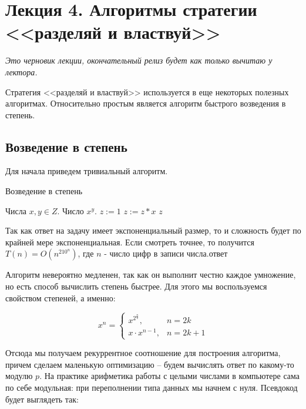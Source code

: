 \documentclass[../book.tex]{subfiles}
\begin{document}
	\section{Лекция 4. Алгоритмы стратегии <<разделяй и властвуй>>}
		\textit{Это черновик лекции, окончательный релиз будет как только вычитаю у лектора.}
		
		
		Стратегия <<разделяй и властвуй>> используется в еще некоторых полезных алгоритмах. Относительно простым является алгоритм быстрого возведения в степень.
		
		\subsection{Возведение в степень}
		
		Для начала приведем тривиальный алгоритм.
		
		\begin{algorithm}[H]
			\caption{Возведение в степень}
			\begin{algorithmic}[1]
				\Require Числа $x, y \in Z$.
				\Ensure Число $x^y$.
					\State $z := 1$
						\State $z := z * x$
					\EndFor
					\State \Return $z$
				\EndFunction
			\end{algorithmic}
		\end{algorithm}
		
		\begin{time}
			Так как ответ на задачу имеет экспоненциальный размер, то и сложность будет по крайней мере экспоненциальная. Если смотреть точнее, то получится $T(n) = O(n^210^n)$, где $n$ - число цифр в записи числа.ответ
		\end{time}
		
		Алгоритм невероятно медленен, так как он выполнит честно каждое умножение, но есть способ вычислить степень быстрее. Для этого мы воспользуемся свойством степеней, а именно:
		
		\[
		x^n =
		\begin{cases}
			x^{2^\frac{n}{2}},& n = 2k \\
			x \cdot x^{n - 1},& n = 2k + 1
		\end{cases}
		\]
		
		Отсюда мы получаем рекуррентное соотношение для построения алгоритма, причем сделаем маленькую оптимизацию -- будем вычислять ответ по какому-то модулю $p$. На практике арифметика работы с целыми числами в компьютере сама по себе модульная: при переполнении типа данных мы начнем с нуля. Псевдокод будет выглядеть так:
		
\end{document}
